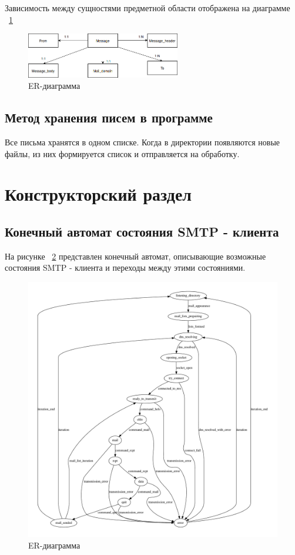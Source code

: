 \documentclass[a4paper,12pt]{article}
\begin{document}
Зависимость между сущностями предметной области отображена на диаграмме ~\ref{fig:er_mail}

\begin{figure}[h]
\centering
\includegraphics[width=0.6\textwidth]{includes/er_mail.png}
\caption{ER-диаграмма}
\label{fig:er_mail}
\end{figure}

\subsection{Метод хранения писем в программе}
Все письма хранятся в одном списке. Когда в директории появляются новые файлы, из них формируется список и отправляется на обработку.

\section{Конструкторский раздел}

\subsection{Конечный автомат состояния SMTP - клиента}
На рисунке ~\ref{fig:fsm} представлен конечный автомат, описывающие возможные состояния SMTP - клиента и переходы между этими состояниями.

\begin{figure}[h]
\centering
\includegraphics[width=1.0\textwidth]{includes/client_fsm.pdf}
\caption{ER-диаграмма}
\label{fig:fsm}
\end{figure}
\end{document}
